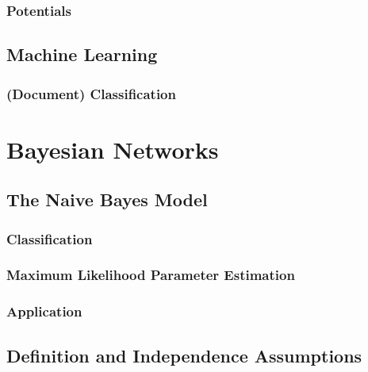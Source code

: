         \subsection{Potentials} %

    \section{Machine Learning} %

        \subsection{(Document) Classification} %

\chapter{Bayesian Networks} %

    \section{The Naive Bayes Model} %

        \subsection{Classification} %

        \subsection{Maximum Likelihood Parameter Estimation} %

        \subsection{Application} %

    \section{Definition and Independence Assumptions} %

